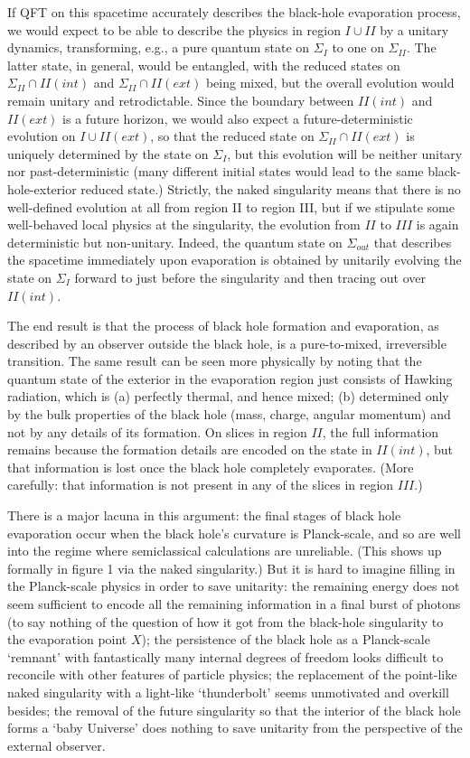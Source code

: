 \documentclass[12pt]{article}
\begin{document}
If QFT on this spacetime accurately describes the black-hole evaporation process, we would expect to be able to describe the physics in region $I \cup II$ by a unitary dynamics, transforming, e.g., a pure quantum state on $\Sigma_I$ to one on $\Sigma_{II}$. The latter state, in general, would be entangled, with the reduced states on $\Sigma_{II} \cap II(int)$ and $\Sigma_{II} \cap II(ext)$ being mixed, but the overall evolution would remain unitary and retrodictable. Since the boundary between $II(int)$ and $II(ext)$ is a future horizon, we would also expect a future-deterministic evolution on $I \cup II(ext)$, so that the reduced state on $\Sigma_{II}\cap II(ext)$ is uniquely determined by the state on $\Sigma_I$, but this evolution will be neither unitary nor past-deterministic (many different initial states would lead to the same black-hole-exterior reduced state.) Strictly, the naked singularity means that there is no well-defined evolution at all from region II to region III, but if we stipulate some well-behaved local physics at the singularity, the evolution from $II$ to $III$ is again deterministic but non-unitary. Indeed, the quantum state on $\Sigma_{out}$ that describes the spacetime immediately upon evaporation is obtained by unitarily evolving the state on $\Sigma_I$ forward to just before the singularity and then tracing out over $II(int)$.

The end result is that the process of black hole formation and evaporation, as described by an observer outside the black hole, is a pure-to-mixed, irreversible transition. The same result can be seen more physically by noting that the quantum state of the exterior in the evaporation region just consists of Hawking radiation, which is (a) perfectly thermal, and hence mixed; (b) determined only by the bulk properties of the black hole (mass, charge, angular momentum) and not by any details of its formation. On slices in region $II$, the full information remains because the formation details are encoded on the state in $II(int)$, but that information is lost once the black hole completely evaporates. (More carefully: that information is not present in any of the slices in region $III$.)

There is a major lacuna in this argument: the final stages of black hole evaporation occur when the black hole's curvature is Planck-scale, and so are well into the regime where semiclassical calculations are unreliable. (This shows up formally in figure 1 via the naked singularity.) But it is hard to imagine filling in the Planck-scale physics in order to save unitarity: the remaining energy does not seem sufficient to encode all the remaining information in a final burst of photons (to say nothing of the question of how it got from the black-hole singularity to the evaporation point $X$); the persistence of the black hole as a Planck-scale `remnant' with fantastically many internal degrees of freedom looks difficult to reconcile with other features of particle physics; the replacement of the point-like naked singularity with a light-like `thunderbolt' seems unmotivated and overkill besides; the removal of the future singularity so that the interior of the black hole forms a `baby Universe' does nothing to save unitarity from the perspective of the external observer.
\end{document}
